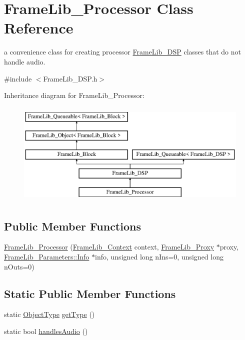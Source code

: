 \hypertarget{class_frame_lib___processor}{}\section{Frame\+Lib\+\_\+\+Processor Class Reference}
\label{class_frame_lib___processor}


a convenience class for creating processor \hyperlink{class_frame_lib___d_s_p}{Frame\+Lib\+\_\+\+D\+SP} classes that do not handle audio.  




{\ttfamily \#include $<$Frame\+Lib\+\_\+\+D\+S\+P.\+h$>$}

Inheritance diagram for Frame\+Lib\+\_\+\+Processor\+:\begin{figure}[H]
\begin{center}
\leavevmode
\includegraphics[height=5.000000cm]{class_frame_lib___processor}
\end{center}
\end{figure}
\subsection*{Public Member Functions}
\begin{DoxyCompactItemize}
\item 
\hyperlink{class_frame_lib___processor_a8892a6fdd58d45c2182bd8dc11a92845}{Frame\+Lib\+\_\+\+Processor} (\hyperlink{class_frame_lib___context}{Frame\+Lib\+\_\+\+Context} context, \hyperlink{struct_frame_lib___proxy}{Frame\+Lib\+\_\+\+Proxy} $\ast$proxy, \hyperlink{class_frame_lib___parameters_1_1_info}{Frame\+Lib\+\_\+\+Parameters\+::\+Info} $\ast$info, unsigned long n\+Ins=0, unsigned long n\+Outs=0)
\end{DoxyCompactItemize}
\subsection*{Static Public Member Functions}
\begin{DoxyCompactItemize}
\item 
static \hyperlink{_frame_lib___types_8h_a842c5e2e69277690b064bf363c017980}{Object\+Type} \hyperlink{class_frame_lib___processor_a9cf7b310f4d1ca8843b201d692fcf544}{get\+Type} ()
\item 
static bool \hyperlink{class_frame_lib___processor_a77869c3007f363ce914d9e0073953660}{handles\+Audio} ()
\end{DoxyCompactItemize}
